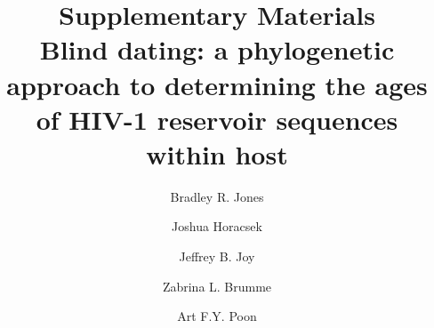 \documentclass[12pt]{article}
\begin{document}
\title{Supplementary Materials \\ Blind dating: a phylogenetic approach to determining the ages of HIV-1 reservoir sequences within host}

\author[1,2]{Bradley R. Jones}
\author[1,2]{Joshua Horacsek}
\author[2,3]{Jeffrey B. Joy}
\author[1,2]{Zabrina L. Brumme}
\author[1,2,3,*]{Art F.Y. Poon}
\baselineskip 22pt
\pagewiselinenumbers

\date{}
\maketitle

\end{document}
